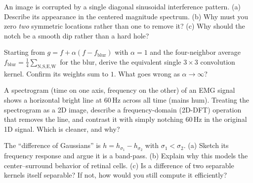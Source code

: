 \begin{exercise}
\label{ch31:ex-notch2}
An image is corrupted by a single diagonal sinusoidal interference pattern. (a)
Describe its appearance in the centered magnitude spectrum. (b) Why must you zero
\emph{two} symmetric locations rather than one to remove it? (c) Why should the
notch be a smooth dip rather than a hard hole?
\end{exercise}

\begin{exercise}
\label{ch31:ex-unsharp}
Starting from $g = f + \alpha(f - f_{\text{blur}})$ with $\alpha=1$ and the
four-neighbor average $f_{\text{blur}} = \frac14\sum_{\text{N,S,E,W}}$ for the
blur, derive the equivalent single $3\times3$ convolution kernel. Confirm its
weights sum to $1$. What goes wrong as $\alpha\to\infty$?
\end{exercise}

\begin{exercise}
\label{ch31:ex-spectrogram}
A spectrogram (time on one axis, frequency on the other) of an EMG signal shows a
horizontal bright line at $60$\,Hz across all time (mains hum). Treating the
spectrogram as a 2D image, describe a frequency-domain (2D-DFT) operation that
removes the line, and contrast it with simply notching $60$\,Hz in the original 1D
signal. Which is cleaner, and why?
\end{exercise}

\begin{exercise}
\label{ch31:ex-dog}
The ``difference of Gaussians'' is $h = h_{\sigma_1} - h_{\sigma_2}$ with
$\sigma_1 < \sigma_2$. (a) Sketch its frequency response and argue it is a
band-pass. (b) Explain why this models the center--surround behavior of retinal
cells. (c) Is a difference of two separable kernels itself separable? If not, how
would you still compute it efficiently?
\end{exercise}
